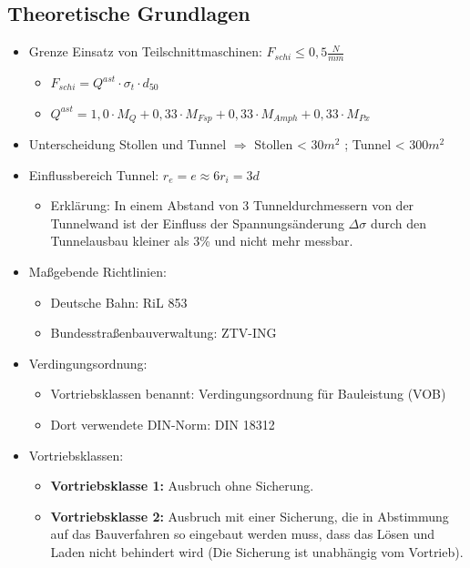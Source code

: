 \documentclass[fleqn,twoside]{article}
\begin{document}
\subsection{Theoretische Grundlagen}
\begin{itemize}
    \item Grenze Einsatz von Teilschnittmaschinen: $F_{schi} \leq 0,5 \frac{N}{mm}$
        \begin{itemize}
            \item $F_{schi}=Q^{ast} \cdot \sigma_t \cdot d_{50}$
            \item $Q^{ast}=1,0 \cdot M_Q + 0,33 \cdot M_{Fsp} + 0,33 \cdot M_{Amph} + 0,33 \cdot M_{Px}$
        \end{itemize}
    \item Unterscheidung Stollen und Tunnel $\Rightarrow$ Stollen < 30$m^2$ ; Tunnel < 300$m^2$
    \item Einflussbereich Tunnel: $r_e = e \approx 6r_i=3d$
    \begin{itemize}
        \item Erklärung: In einem Abstand von 3 Tunneldurchmessern von der Tunnelwand ist der Einfluss der Spannungsänderung $\Delta\sigma$ durch den Tunnelausbau kleiner als 3\% und nicht mehr messbar.
    \end{itemize}
    \item Maßgebende Richtlinien:
        \begin{itemize}
            \item Deutsche Bahn: RiL 853
            \item Bundesstraßenbauverwaltung: ZTV-ING
        \end{itemize}
    \item Verdingungsordnung:
        \begin{itemize}
            \item Vortriebsklassen benannt: Verdingungsordnung für Bauleistung (VOB)
            \item Dort verwendete DIN-Norm: DIN 18312
        \end{itemize}
    \item Vortriebsklassen:
        \begin{itemize}
            \item \textbf{Vortriebsklasse 1:} Ausbruch ohne Sicherung.
            \item \textbf{Vortriebsklasse 2:} Ausbruch mit einer Sicherung, die in Abstimmung auf das Bauverfahren so eingebaut werden muss, dass das Lösen und Laden nicht behindert wird (Die Sicherung ist unabhängig vom Vortrieb).

\end{itemize}
\end{itemize}
\end{document}
